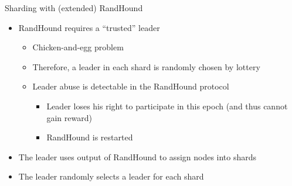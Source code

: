 \begin{frame}{Sharding with (extended) RandHound}
    \begin{itemize}
        \item RandHound requires a ``trusted'' leader
            \begin{itemize}
                \item Chicken-and-egg problem
                \item Therefore, a leader in each shard is randomly chosen by lottery
                \item Leader abuse is detectable in the RandHound protocol
                    \begin{itemize}
                        \item Leader loses his right to participate in this epoch (and thus cannot gain reward)
                        \item RandHound is restarted
                    \end{itemize}
            \end{itemize}
        \item The leader uses output of RandHound to assign nodes into shards
        \item The leader randomly selects a leader for each shard
    \end{itemize}
\end{frame}

